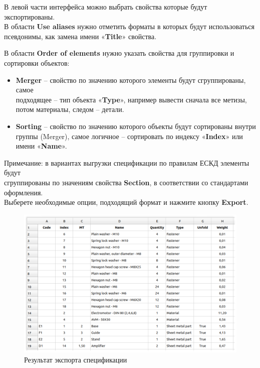 \documentclass[a4paper,12pt]{article}
\begin{document}
В левой части интерфейса можно выбрать свойства которые будут экспортированы.\\

В области \textbf{Use aliases} нужно отметить форматы в которых будут использоваться псевдонимы, как замена имени «\textbf{Title}» свойства.\\

\pagebreak


В области \textbf{Order of elements} нужно указать свойства для группировки и сортировки объектов:

\begin{itemize}
	\item \textbf{Merger} -- свойство по значению которого элементы будут сгруппированы, самое\\подходящее -- тип объекта «\textbf{Type}», например вывести сначала все метизы, потом материалы, следом -- детали.
	\item \textbf{Sorting} -- свойство по значению которого объекты будут сортированы внутри группы (Merger), самое логичное -- сортировать по индексу «\textbf{Index}» или имени «\textbf{Name}».
\end{itemize}

Примечание: в вариантах выгрузки спецификации по правилам ЕСКД элементы будут\\сгруппированы по значениям свойства \textbf{Section}, в соответствии со стандартами оформления.\\

Выберете необходимые опции, подходящий формат и нажмите кнопку \textbf{Export}.

\begin{figure}[htp]
	\centering
	\includegraphics[width=1\textwidth]{img/bom_result.png}
	\caption{Результат экспорта спецификации}
	\label{sec:bom_result}
\end{figure}
\end{document}
